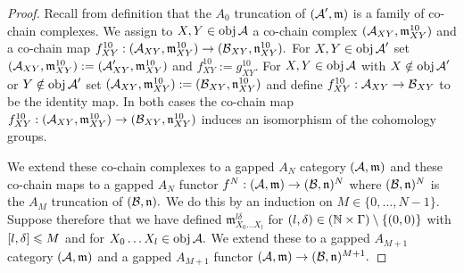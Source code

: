 \documentclass{article}
\theoremstyle{plain}%
\theoremstyle{definition}
\numberwithin{equation}{section}
\numberwithin{figure}{section}
\def\fm{{\mathfrak m}}
\def\fn{{\mathfrak n}}
\def\le{\leqslant\nobreak}
\def\cA{{\mathbin{\cal A}}}
\def\cB{{\mathbin{\cal B}}}
\def\de{\delta}
\def\Ga{\Gamma}
\def\-{\setminus}
\begin{document}
\begin{proof}
Recall from definition that the $A_0$ truncation of $(\cA',\fm)$ is a family of co-chain complexes.
We assign to $X,Y\in\obj\cA$ a co-chain complex $(\cA_{XY},\fm^{10}_{XY})$ and a co-chain map $f^{10}_{XY}:(\cA_{XY},\fm^{10}_{XY})\to(\cB_{XY},\fn^{10}_{XY}).$
For $X,Y\in\obj\cA'$ set $(\cA_{XY},\fm^{10}_{XY}):=(\cA_{XY}',\fm^{10}_{XY})$ and $f^{10}_{XY}:=g^{10}_{XY}.$
For $X,Y\in\obj\cA$ with $X\notin\obj\cA'$ or $Y\notin\obj\cA'$ set $(\cA_{XY},\fm^{10}_{XY}):=(\cB_{XY},\fn^{10}_{XY})$ and define $f^{10}_{XY}:\cA_{XY}\to\cB_{XY}$ to be the identity map.
In both cases the co-chain map $f^{10}_{XY}:(\cA_{XY},\fm^{10}_{XY})\to (\cB_{XY},\fn^{10}_{XY})$ induces an isomorphism of the cohomology groups.

We extend these co-chain complexes to a gapped $A_N$ category $(\cA,\fm)$ and these co-chain maps to a gapped $A_N$ functor $f^N:(\cA,\fm)\to(\cB,\fn)^N$ where $(\cB,\fn)^N$ is the $A_M$ truncation of $(\cB,\fn).$
We do this by an induction on $M\in\{0,\dots,N-1\}.$
Suppose therefore that we have defined $\fm^{l\de}_{X_0\dots X_l}$ for $(l,\de)\in(\N\times\Ga)\-\{(0,0)\}$ with $[l,\de]\le M$ and for $X_0\dots X_l\in\obj\cA.$
We extend these to a gapped $A_{M+1}$ category $(\cA,\fm)$ and a gapped $A_{M+1}$ functor $(\cA,\fm)\to(\cB,\fn)^{M+1}.$


\end{proof}
\end{document}
